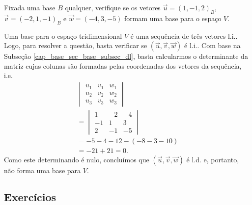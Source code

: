 \begin{exeresol}
  Fixada uma base $B$ qualquer, verifique se os vetores $\vec{u}=(1,-1,2)_B$, $\vec{v}=(-2,1,-1)_B$ e $\vec{w}=(-4,3,-5)$ formam uma base para o espaço $V$.
\end{exeresol}
\begin{resol}
  Uma base para o espaço tridimensional $V$ é uma sequência de três vetores l.i.. Logo, para resolver a questão, basta verificar se $(\vec{u},\vec{v},\vec{w})$ é l.i.. Com base na Subseção \ref{cap_base_sec_base_subsec_dl}, basta calcularmos o determinante da matriz cujas colunas são formadas pelas coordenadas dos vetores da sequência, i.e.
  \begin{gather}
    \begin{vmatrix}
      u_1 & v_1 & w_1 \\
      u_2 & v_2 & w_2 \\
      u_3 & v_3 & w_3
    \end{vmatrix}\\
    = \begin{vmatrix}
      1 & -2 & -4 \\
      -1 & 1 & 3 \\
      2 & -1 & -5
    \end{vmatrix}\\
    = -5-4-12-(-8-3-10)\\
    = -21+21 = 0.
  \end{gather}
  Como este determinando é nulo, concluímos que $(\vec{u},\vec{v},\vec{w})$ é l.d. e, portanto, não forma uma base para $V$.
\end{resol}

\subsection*{Exercícios}


